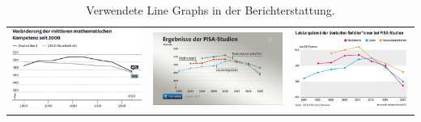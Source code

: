 \documentclass[
  jou,
  floatsintext,
  longtable,
  nolmodern,
  notxfonts,
  notimes,
  colorlinks=true,linkcolor=blue,citecolor=blue,urlcolor=blue]{apa7}
\begin{document}
\begin{ThreePartTable}

\begin{longtable}[]{@{}
  >{\raggedright\arraybackslash}p{}
  >{\raggedright\arraybackslash}p{}
  >{\raggedright\arraybackslash}p{}@{}}
\caption{Verwendete Line Graphs in der
Berichterstattung.}\label{tbl-pisalinegraphs}\tabularnewline
\toprule\noalign{}
\endfirsthead
\endhead
\bottomrule\noalign{}
\endlastfoot
\includegraphics[width=9.375in,height=\textheight,keepaspectratio]{img/sz.png}
&
\includegraphics[width=9.375in,height=\textheight,keepaspectratio]{img/tagessschau.jpg}
&
\includegraphics[width=8.33333in,height=\textheight,keepaspectratio]{img/taz.jpeg} \\

\end{longtable}
\end{ThreePartTable}
\end{document}
